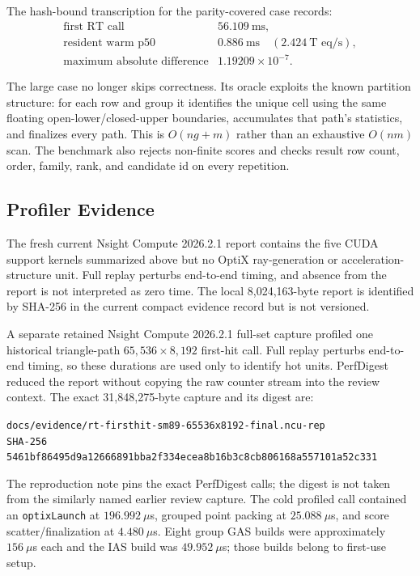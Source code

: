 \documentclass[11pt]{article}
\begin{document}
The hash-bound transcription for the parity-covered case records:
\[
\begin{array}{ll}
\text{first RT call} & 56.109\ \text{ms},\\
\text{resident warm p50} & 0.886\ \text{ms}\quad (2.424\ \text{T eq/s}),\\
\text{maximum absolute difference} & 1.19209\times 10^{-7}.
\end{array}
\]

The large case no longer skips correctness. Its oracle exploits the known
partition structure: for each row and group it identifies the unique cell using
the same floating open-lower/closed-upper boundaries, accumulates that path's
statistics, and finalizes every path. This is $O(n g + m)$ rather than an
exhaustive $O(nm)$ scan. The benchmark also rejects non-finite scores and checks
result row count, order, family, rank, and candidate id on every repetition.

\subsection{Profiler Evidence}

The fresh current Nsight Compute 2026.2.1 report contains the five CUDA support
kernels summarized above but no OptiX ray-generation or acceleration-structure
unit. Full replay perturbs end-to-end timing, and absence from the report is not
interpreted as zero time. The local 8,024,163-byte report is identified by
SHA-256 in the current compact evidence record but is not versioned.

A separate retained Nsight Compute 2026.2.1 full-set capture profiled one
historical triangle-path
$65{,}536 \times 8{,}192$ first-hit call. Full replay perturbs end-to-end timing,
so these durations are used only to identify hot units. PerfDigest reduced the
report without copying the raw counter stream into the review context. The
exact 31,848,275-byte capture and its digest are:
\begin{center}
\small
\texttt{docs/evidence/rt-firsthit-sm89-65536x8192-final.ncu-rep}\\[0.25em]
\texttt{SHA-256 5461bf86495d9a12666891bba2f334ecea8b16b3c8cb806168a557101a52c331}
\end{center}
The reproduction note pins the exact PerfDigest calls; the digest is not taken
from the similarly named earlier review capture.
The cold profiled call contained an \texttt{optixLaunch} at $196.992\ \mu$s, grouped
point packing at $25.088\ \mu$s, and score scatter/finalization at
$4.480\ \mu$s. Eight group GAS builds were approximately $156\ \mu$s each and
the IAS build was $49.952\ \mu$s; those builds belong to first-use setup.
\end{document}
